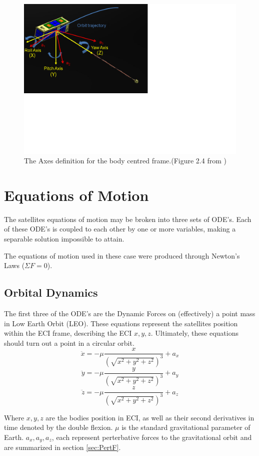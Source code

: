 \documentclass[12pt,a4paper]{article}
\begin{document}
\begin{figure}[h!]
\begin{center}
	\includegraphics[scale=0.25]{BodyAxis.png}
	\caption{The Axes definition for the body centred frame.(Figure 2.4 from \cite{KTH})}
\end{center}
\end{figure}

\pagebreak

\section{Equations of Motion}

The satellites equations of motion may be broken into three sets of ODE's. Each of these ODE's is coupled to each other by one or more variables, making a separable solution impossible to attain. 

The equations of motion used in these case were produced through Newton's Laws ($\Sigma F=0$). 
\subsection{Orbital Dynamics}
The first three of the ODE's are the Dynamic Forces on (effectively) a point mass in Low Earth Orbit (LEO). These equations represent the satellites position within the ECI frame, describing the ECI $x,y,z$. Ultimately, these equations should turn out a point in a circular orbit. 
\[\ddot{x}=-\mu\frac{x}{(\sqrt{x^{2}+y^{2}+z^{2}})^3}+a_{x}\]
\[\ddot{y}=-\mu\frac{y}{(\sqrt{x^{2}+y^{2}+z^{2}})^3}+a_{y}\]
\[\ddot{z}=-\mu\frac{z}{(\sqrt{x^{2}+y^{2}+z^{2}})^3}+a_{z}\]

Where $x,y,z$ are the bodies position in ECI, as well as their second derivatives in time denoted by the double flexion. $\mu$ is the standard gravitational parameter of Earth. $a_{x},a_{y},a_{z}$, each represent perterbative forces to the gravitational orbit and are summarized in section \ref{sec:PertF}.
\end{document}
